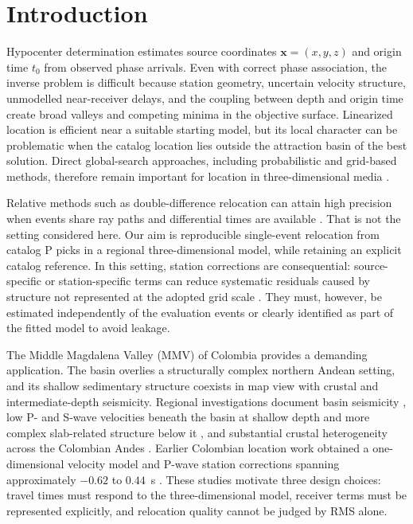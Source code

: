 \documentclass[10pt]{article}
\begin{document}
\section{Introduction}

Hypocenter determination estimates source coordinates $\bm{x}=(x,y,z)$ and origin time $t_0$ from observed phase arrivals. Even with correct phase association, the inverse problem is difficult because station geometry, uncertain velocity structure, unmodelled near-receiver delays, and the coupling between depth and origin time create broad valleys and competing minima in the objective surface. Linearized location is efficient near a suitable starting model, but its local character can be problematic when the catalog location lies outside the attraction basin of the best solution. Direct global-search approaches, including probabilistic and grid-based methods, therefore remain important for location in three-dimensional media \citep{Lomax2000}.

Relative methods such as double-difference relocation can attain high precision when events share ray paths and differential times are available \citep{WaldhauserEllsworth2000}. That is not the setting considered here. Our aim is reproducible single-event relocation from catalog P picks in a regional three-dimensional model, while retaining an explicit catalog reference. In this setting, station corrections are consequential: source-specific or station-specific terms can reduce systematic residuals caused by structure not represented at the adopted grid scale \citep{OjedaHavskov2001,Nooshiri2017}. They must, however, be estimated independently of the evaluation events or clearly identified as part of the fitted model to avoid leakage.

The Middle Magdalena Valley (MMV) of Colombia provides a demanding application. The basin overlies a structurally complex northern Andean setting, and its shallow sedimentary structure coexists in map view with crustal and intermediate-depth seismicity. Regional investigations document basin seismicity \citep{Londono2019}, low P- and S-wave velocities beneath the basin at shallow depth and more complex slab-related structure below it \citep{Londono2020}, and substantial crustal heterogeneity across the Colombian Andes \citep{Poveda2018}. Earlier Colombian location work obtained a one-dimensional velocity model and P-wave station corrections spanning approximately $-0.62$ to $0.44$~s \citep{OjedaHavskov2001}. These studies motivate three design choices: travel times must respond to the three-dimensional model, receiver terms must be represented explicitly, and relocation quality cannot be judged by RMS alone.
\end{document}
